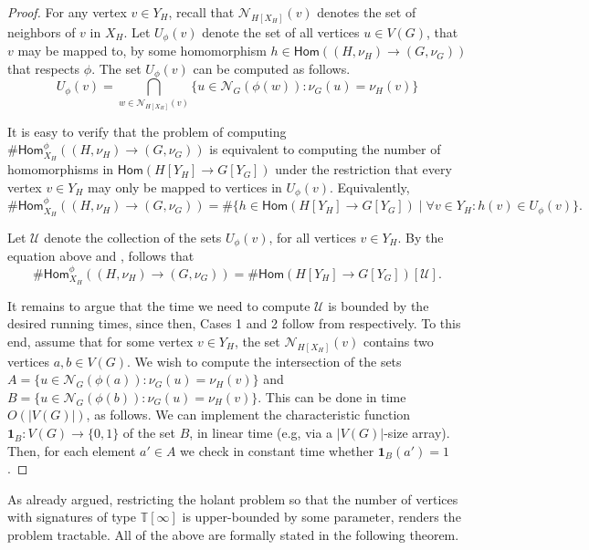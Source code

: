 \documentclass[authorcolumns,numberwithinsect]{no-lipics-v2022}
\newcommand{\homs}[2]{\mathsf{Hom}(#1 \to #2)}
\newcommand{\parthomsX}[3]{\mathsf{Hom}^{\phi}_{#3}(#1 \to #2)}
\begin{document}
\begin{proof}
For any vertex $v \in Y_H$, recall that $\mathcal{N}_{H[X_H]}(v)$ denotes the set of neighbors of $v$ in $X_H$. Let $U_{\phi}(v)$ denote the set of all vertices $u \in V(G)$, that $v$ may be mapped to, by some homomorphism $h \in \homs{(H,\nu_H)}{(G,\nu_G)}$ that respects $\phi$. The set $U_{\phi}(v)$ can be computed as follows. \begin{equation*}
U_{\phi}(v) = \bigcap_{w \in \mathcal{N}_{H[X_H]}(v)}\{u \in \mathcal{N}_{G}(\phi(w)) : \nu_G(u) = \nu_H(v)\}
\end{equation*}

It is easy to verify that the problem of computing $\#\parthomsX{(H, \nu_H)}{(G, \nu_G)}{X_H}$ is equivalent to computing the number of homomorphisms in $\homs{H[Y_H]}{G[Y_G]}$ under the restriction that every vertex $v \in Y_H$ may only be mapped to vertices in $U_{\phi}(v)$. Equivalently,
\[\#\parthomsX{(H, \nu_H)}{(G, \nu_G)}{X_H} = \#\{h \in \homs{H[Y_H]}{G[Y_G]} \mid \forall v\in Y_H : h(v) \in U_{\phi}(v)\}.\]

Let $\mathcal{U}$ denote the collection of the sets $U_{\phi}(v)$, for all vertices $v \in Y_H$. By the equation above and , follows that 
\[\#\parthomsX{(H,\nu_H)}{(G,\nu_G)}{X_H} = \#\homs{H[Y_H]}{G[Y_G]}[\mathcal{U}].\]

It remains to argue that the time we need to compute $\mathcal{U}$ is bounded by the desired running times, since then, Cases 1 and 2 follow from  respectively. To this end, assume that for some vertex $v\in Y_H$, the set $\mathcal{N}_{H[X_H]}(v)$ contains two vertices $a, b \in V(G)$. We wish to compute the intersection of the sets $A = \{u \in \mathcal{N}_{G}(\phi(a)) : \nu_G(u) = \nu_H(v)\}$ and $B = \{u \in \mathcal{N}_{G}(\phi(b)) : \nu_G(u) = \nu_H(v)\}$. This can be done in time $O(|V(G)|)$, as follows. We can implement the characteristic function $\boldsymbol{1}_B : V(G) \rightarrow \{0, 1\}$ of the set $B$, in linear time (e.g, via a $|V(G)|$-size array). Then, for each element $a' \in A$ we check in constant time whether $\boldsymbol{1}_B(a') = 1$.
\end{proof}

As already argued, restricting the holant problem so that the number of vertices with signatures of type $\mathbb{T}[\infty]$ is upper-bounded by some parameter, renders the problem tractable. All of the above are formally stated in the following theorem.
\end{document}
